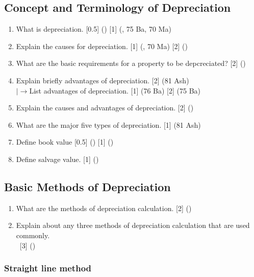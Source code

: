 \documentclass[12pt]{article}
\newcommand{\lb}{\\ $\left|\rightarrow\right.$}
\newcommand{\enter}{\\\textcolor{white}{1}}
\begin{document}
	\subsection{Concept and Terminology of Depreciation}
		\begin{enumerate}[noitemsep, topsep=0pt]
			\item What is depreciation. \hfill [0.5] () [1] (, 75 Ba, 70 Ma)

			\item Explain the causes for depreciation. \hfill [1] (, 70 Ma) [2] () 
			
			\item What are the basic requirements for a property to be depcreciated? \hfill [2] ()

			\item Explain briefly advantages of depreciation. \hfill [2] (81 Ash)
			\lb List advantages of depreciation. \hfill [1] (76 Ba) [2] (75 Ba)

			\item Explain the causes and advantages of depreciation. \hfill [2] ()

			\item What are the major five types of depreciation. \hfill [1] (81 Ash)

			\item Define book value \hfill [0.5] () [1] ()
			\item Define salvage value. \hfill [1] ()
		\end{enumerate}

	\subsection{Basic Methods of Depreciation}
		\begin{enumerate}[noitemsep, topsep=0pt]
			\item What are the methods of depreciation calculation. \hfill [2] ()

			\item Explain about any three methods of depreciation calculation that are used commonly. 
			\enter\hfill [3] ()
		\end{enumerate}

	\subsubsection{Straight line method}
\end{document}
